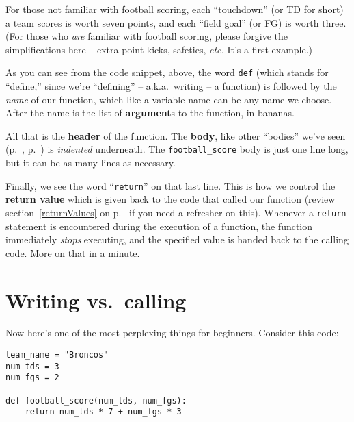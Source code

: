 For those not familiar with football scoring, each ``touchdown'' (or TD for
short) a team scores is worth seven points, and each ``field goal'' (or FG) is
worth three. (For those who \textit{are} familiar with football scoring, please
forgive the simplifications here -- extra point kicks, safeties, \textit{etc.}
It's a first example.)


As you can see from the code snippet, above, the word \texttt{def} (which
stands for ``define,'' since we're ``defining'' -- a.k.a.~writing -- a
function) is followed by the \textit{name} of our function, which like a
variable name can be any name we choose. After the name is the list of
\textbf{argument}s to the function, in bananas.


All that is the \textbf{header} of the function. The \textbf{body}, like other
``bodies'' we've seen (p.~\pageref{loopBody}, p.~\pageref{ifBody}) is
\textit{indented} underneath. The \texttt{football\_score} body is just one
line long, but it can be as many lines as necessary.


Finally, we see the word ``\texttt{return}'' on that last line. This is how we
control the \textbf{return value} which is given back to the code that called
our function (review section~\ref{returnValues} on p.~\pageref{returnValues} if
you need a refresher on this). Whenever a \texttt{return} statement is
encountered during the execution of a function, the function immediately
\textit{stops} executing, and the specified value is handed back to the calling
code. More on that in a minute.

\section{Writing vs.~calling}

Now here's one of the most perplexing things for beginners. Consider this code:

\begin{Verbatim}[fontsize=\small,samepage=true,frame=single,framesep=3mm]
team_name = "Broncos"
num_tds = 3
num_fgs = 2

def football_score(num_tds, num_fgs):
    return num_tds * 7 + num_fgs * 3
\end{Verbatim}

